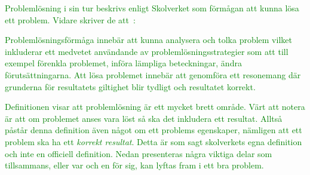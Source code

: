 \noindent \textcolor{green}{Problemlösning i sin tur beskrivs enligt Skolverket som förmågan att kunna lösa ett problem. Vidare skriver de att~\cite{ProblemDef}:}



\begin{displayquote}
\textcolor{green}{Problemlösningsförmåga innebär att kunna analysera och tolka problem vilket inkluderar ett medvetet användande av problemlösningsstrategier som att till exempel förenkla problemet, införa lämpliga beteckningar, ändra förutsättningarna. Att lösa problemet innebär att genomföra ett resonemang där grunderna för resultatets giltighet blir tydligt och resultatet korrekt.}
\end{displayquote}

\noindent \textcolor{green}{
Definitionen visar att problemlösning är ett mycket brett område.
Värt att notera är att om problemet anses vara löst så ska det inkludera ett resultat. Alltså påstår denna definition även något om ett problems egenskaper, nämligen att ett problem ska ha ett \textsl{korrekt resultat}. Detta är som sagt skolverkets egna definition och inte en officiell definition. 
Nedan presenteras några viktiga delar som tillsammans, eller var och en för sig, kan lyftas fram i ett bra problem.}

